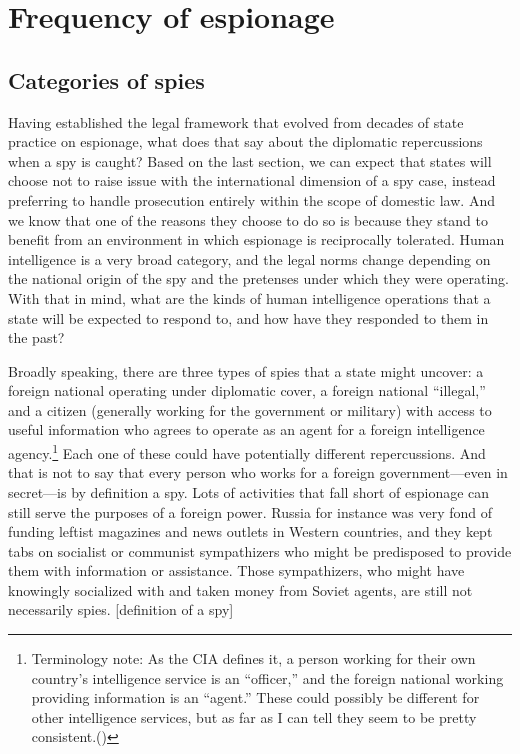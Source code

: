 \documentclass[12pt]{article}
\begin{document}

\section{Frequency of espionage}
\subsection{Categories of spies}
Having established the legal framework that evolved from decades of state practice on espionage, what does that say about the diplomatic repercussions when a spy is caught? Based on the last section, we can expect that states will choose not to raise issue with the international dimension of a spy case, instead preferring to handle prosecution entirely within the scope of domestic law. And we know that one of the reasons they choose to do so is because they stand to benefit from an environment in which espionage is reciprocally tolerated. Human intelligence is a very broad category, and the legal norms change depending on the national origin of the spy and the pretenses under which they were operating. With that in mind, what are the kinds of human intelligence operations that a state will be expected to respond to, and how have they responded to them in the past?

Broadly speaking, there are three types of spies that a state might uncover: a foreign national operating under diplomatic cover, a foreign national ``illegal,'' and a citizen (generally working for the government or military) with access to useful information who agrees to operate as an agent for a foreign intelligence agency.\footnote{Terminology note: As the CIA defines it, a person working for their own country's intelligence service is an ``officer,'' and the foreign national working providing information is an ``agent.'' These could possibly be different for other intelligence services, but as far as I can tell they seem to be pretty consistent.(\cite{cia_insider_2019})} Each one of these could have potentially different repercussions. And that is not to say that every person who works for a foreign government---even in secret---is by definition a spy. Lots of activities that fall short of espionage can still serve the purposes of a foreign power. Russia for instance was very fond of funding leftist magazines and news outlets in Western countries, and they kept tabs on socialist or communist sympathizers who might be predisposed to provide them with information or assistance. Those sympathizers, who might have knowingly socialized with and taken money from Soviet agents, are still not necessarily spies. [definition of a spy]
\end{document}
